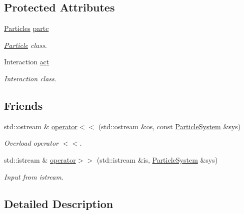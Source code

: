 \subsection*{Protected Attributes}
\begin{DoxyCompactItemize}
\item 
\mbox{\hyperlink{struct_space_h_1_1_particles}{Particles}} \mbox{\hyperlink{class_space_h_1_1_particle_system_aa82364f412d9de96503478f116b7b77b}{partc}}
\begin{DoxyCompactList}\small\item\em \mbox{\hyperlink{struct_space_h_1_1_particle}{Particle}} class. \end{DoxyCompactList}\item 
Interaction \mbox{\hyperlink{class_space_h_1_1_particle_system_a9fa9c5d8996d8574f7fdd0b201f3383e}{act}}
\begin{DoxyCompactList}\small\item\em Interaction class. \end{DoxyCompactList}\end{DoxyCompactItemize}
\subsection*{Friends}
\begin{DoxyCompactItemize}
\item 
std\+::ostream \& \mbox{\hyperlink{class_space_h_1_1_particle_system_adfa6e43fea537f62484260b659155912}{operator$<$$<$}} (std\+::ostream \&os, const \mbox{\hyperlink{class_space_h_1_1_particle_system}{Particle\+System}} \&sys)
\begin{DoxyCompactList}\small\item\em Overload operator $<$$<$. \end{DoxyCompactList}\item 
std\+::istream \& \mbox{\hyperlink{class_space_h_1_1_particle_system_a5e0b0ba1120f72d983344016f57daa92}{operator$>$$>$}} (std\+::istream \&is, \mbox{\hyperlink{class_space_h_1_1_particle_system}{Particle\+System}} \&sys)
\begin{DoxyCompactList}\small\item\em Input from istream. \end{DoxyCompactList}\end{DoxyCompactItemize}


\subsection{Detailed Description}
